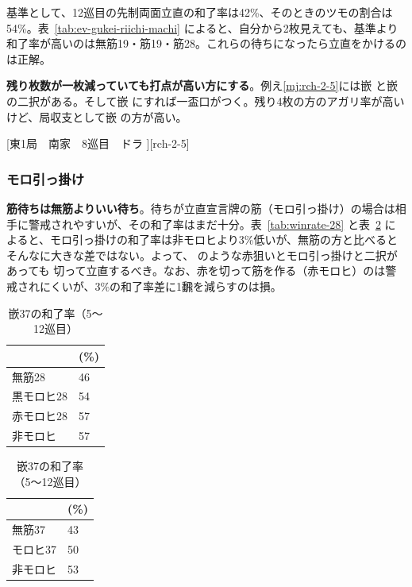 \documentclass[10pt, twocolumn]{article}
\begin{document}
基準として、12巡目の先制両面立直の和了率は42\%、そのときのツモの割合は54\%\citep[][p. 26]{miinin-stat}。表~\ref{tab:ev-gukei-riichi-machi} によると、自分から2枚見えても、基準より和了率が高いのは無筋19・筋19・筋28。これらの待ちになったら立直をかけるのは正解。

\textbf{残り枚数が一枚減っていても打点が高い方にする}\citep[][pp. 91--92]{miinin-choice}。例え\ref{mj:rch-2-5}には嵌  と嵌  の二択がある。そして嵌  にすれば一盃口がつく。残り4枚の方のアガリ率が高いけど、局収支として嵌  の方が高い。

[東1局　南家　8巡目　ドラ ][rch-2-5]

\subsubsection*{モロ引っ掛け} 

\textbf{筋待ちは無筋よりいい待ち}\citep[][p. 77]{miinin-stat}。待ちが立直宣言牌の筋（モロ引っ掛け）の場合は相手に警戒されやすいが、その和了率はまだ十分。表~\ref{tab:winrate-28} と表~\ref{tab:winrate-37} によると、モロ引っ掛けの和了率は非モロヒより3\%低いが、無筋の方と比べるとそんなに大きな差ではない。よって、 のような赤狙いとモロ引っ掛けと二択があっても  切って立直するべき\citep[][pp. 71--72]{miinin-choice}。なお、赤を切って筋を作る（赤モロヒ）のは警戒されにくいが、3\%の和了率差に1飜を減らすのは損。

\begin{table}[ht]
  \centering
  \begin{minipage}{.48\linewidth}
    \centering
      \begin{tabular}{ll}
        & (\%) \\
        \hline
        無筋28 & 46 \\
        黒モロヒ28 & 54 \\
        赤モロヒ28 & 57 \\
        非モロヒ & 57
      \end{tabular}
      \caption{嵌28の和了率（5〜12巡目）}
      \label{tab:winrate-28}
    \end{minipage}%
  \begin{minipage}{.48\linewidth}
    \centering
    \begin{tabular}{ll}
      & (\%) \\
      \hline
      無筋37 & 43 \\
      モロヒ37 & 50 \\
      非モロヒ & 53 \\
    \end{tabular}
    \caption{嵌37の和了率（5〜12巡目）}
    \label{tab:winrate-37}
  \end{minipage}%
\end{table}
\end{document}
